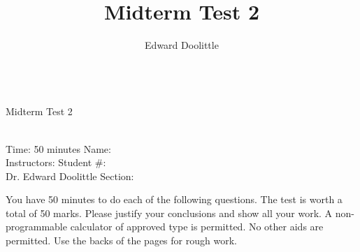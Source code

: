\documentclass[12pt]{article}
\title{Midterm Test 2}
\author{Edward Doolittle}
\begin{document}
\thispagestyle{plain}

\begin{center}
  \quad\\
  \LARGE{Midterm Test 2}
\end{center}

\begin{flushleft}
\quad\\
Time: 50 minutes                \hfill       Name: \underline{\hspace{2in}}  \\
Instructors:                    \hfill Student \#: \underline{\hspace{2in}}  \\
\quad Dr. Edward Doolittle      \hfill    Section: \underline{\hspace{2in}}  \\
\end{flushleft}


\noindent
You have 50 minutes to do each of the following questions.
The test is worth a total of 50 marks.
Please justify your conclusions and
show all your work.
A non-programmable calculator of approved type is permitted.  No other aids
are permitted.
Use the backs of the pages for rough work.
\end{document}
